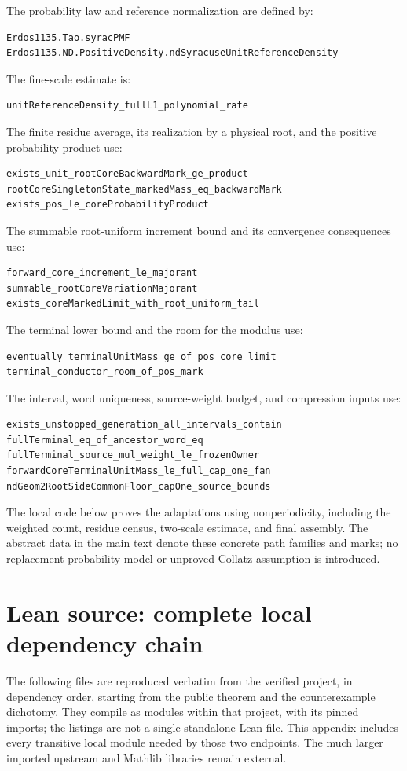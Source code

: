 \documentclass[11pt]{article}
\begin{document}
The probability law and reference normalization are defined by:
\begin{Verbatim}[fontsize=\footnotesize,breaklines=true,breakanywhere=true]
Erdos1135.Tao.syracPMF
Erdos1135.ND.PositiveDensity.ndSyracuseUnitReferenceDensity
\end{Verbatim}
The fine-scale estimate is:
\begin{Verbatim}[fontsize=\footnotesize,breaklines=true,breakanywhere=true]
unitReferenceDensity_fullL1_polynomial_rate
\end{Verbatim}
The finite residue average, its realization by a physical root, and the
positive probability product use:
\begin{Verbatim}[fontsize=\footnotesize,breaklines=true,breakanywhere=true]
exists_unit_rootCoreBackwardMark_ge_product
rootCoreSingletonState_markedMass_eq_backwardMark
exists_pos_le_coreProbabilityProduct
\end{Verbatim}
The summable root-uniform increment bound and its convergence consequences use:
\begin{Verbatim}[fontsize=\footnotesize,breaklines=true,breakanywhere=true]
forward_core_increment_le_majorant
summable_rootCoreVariationMajorant
exists_coreMarkedLimit_with_root_uniform_tail
\end{Verbatim}
The terminal lower bound and the room for the modulus use:
\begin{Verbatim}[fontsize=\footnotesize,breaklines=true,breakanywhere=true]
eventually_terminalUnitMass_ge_of_pos_core_limit
terminal_conductor_room_of_pos_mark
\end{Verbatim}
The interval, word uniqueness, source-weight budget, and compression inputs use:
\begin{Verbatim}[fontsize=\footnotesize,breaklines=true,breakanywhere=true]
exists_unstopped_generation_all_intervals_contain
fullTerminal_eq_of_ancestor_word_eq
fullTerminal_source_mul_weight_le_frozenOwner
forwardCoreTerminalUnitMass_le_full_cap_one_fan
ndGeom2RootSideCommonFloor_capOne_source_bounds
\end{Verbatim}
The local code below proves the adaptations using nonperiodicity, including
the weighted count, residue census, two-scale estimate, and final assembly.
The abstract data in the main text denote these concrete path families and
marks; no replacement probability model or unproved Collatz assumption
is introduced.

\section{Lean source: complete local dependency chain}
The following files are reproduced verbatim from the verified project, in
dependency order, starting from the public theorem and the counterexample
dichotomy. They compile as modules within that project, with its pinned
imports; the listings are not a single standalone Lean file. This appendix
includes every transitive local module needed by those two endpoints.
The much larger imported upstream and Mathlib libraries remain external.
\end{document}
